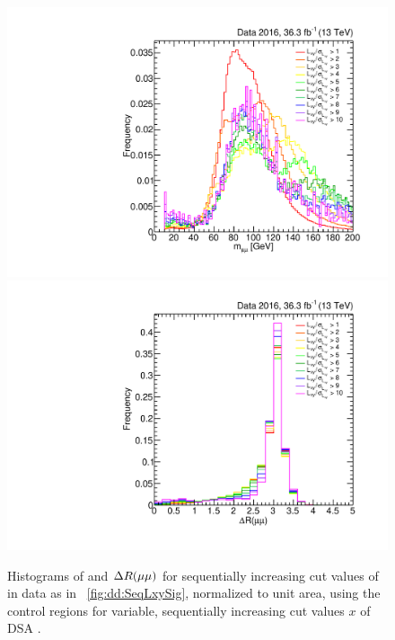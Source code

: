 \begin{figure}[p]
  \centering
  \includegraphics[width=\DSquareWidth]{figures/displaced/BGEST_EffectOfLxySigCut_Mass_Data_DY-Like.pdf}
  \hspace*{-2em}
  \includegraphics[width=\DSquareWidth]{figures/displaced/BGEST_EffectOfLxySigCut_DeltaR_Data_DY-Like.pdf}
  \caption[Histograms of \mMuMu and $\deltaR(\Pgm\Pgm)$ for DY-like events in data for sequentially increasing cut values of \LxySig.]{Histograms of  \mMuMu and  $\deltaR(\Pgm\Pgm)$ for sequentially increasing cut values of \LxySig in data as in \Fig~\ref{fig:dd:SeqLxySig}, normalized to unit area, using the control regions  for variable, sequentially increasing cut values $x$ of DSA \LxySig.}
  \label{fig:dd:SeqLxySig_DY_MassDeltaR}
\end{figure}

